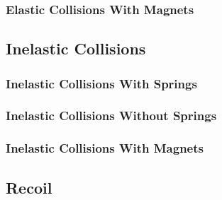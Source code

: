 \documentclass[12pt]{article}
\begin{document}
\subsubsection{Elastic Collisions With Magnets}
\subsection{Inelastic Collisions}
\subsubsection{Inelastic Collisions With Springs}
\subsubsection{Inelastic Collisions Without Springs}
\subsubsection{Inelastic Collisions With Magnets}
\subsection{Recoil}
\end{document}
